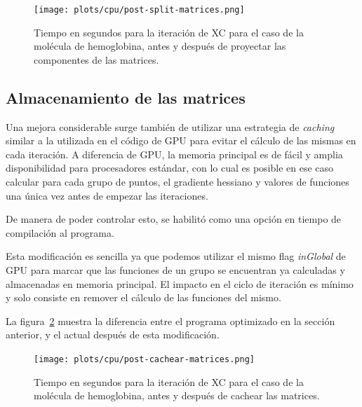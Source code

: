 \begin{figure}[htbp]
   \centering
   \texttt{[image: plots/cpu/post-split-matrices.png]}
   \caption{Tiempo en segundos para la iteraci\'on de XC para el caso de la
   mol\'ecula de hemoglobina, antes y despu\'es de proyectar las componentes
   de las matrices.}
   \label{fig:lio-post-partir-mats}
\end{figure}

\subsection{Almacenamiento de las matrices}

Una mejora considerable surge tambi\'en de utilizar una estrategia de \textit{caching}
similar a la utilizada en el c\'odigo de GPU para evitar el c\'alculo de las mismas
en cada iteraci\'on. A diferencia de GPU, la memoria principal es de f\'acil y
amplia disponibilidad para procesadores est\'andar, con lo cual es posible en ese
caso calcular para cada grupo de puntos, el gradiente hessiano y valores de
funciones una \'unica vez antes de empezar las iteraciones.

De manera de poder controlar esto, se habilit\'o como una opci\'on en tiempo de
compilaci\'on al programa.

Esta modificaci\'on es sencilla ya que podemos utilizar el mismo flag
\textit{inGlobal} de GPU para marcar que las funciones de un grupo se encuentran
ya calculadas y almacenadas en memoria principal. El impacto en el ciclo de
iteraci\'on es m\'inimo y solo consiste en remover el c\'alculo de las funciones
del mismo.

La figura~\ref{fig:lio-post-cachear} muestra la diferencia entre el programa
optimizado en la secci\'on anterior, y el actual despu\'es de esta modificaci\'on.

\begin{figure}[htbp]
   \centering
   \texttt{[image: plots/cpu/post-cachear-matrices.png]}
   \caption{Tiempo en segundos para la iteraci\'on de XC para el caso de la
   mol\'ecula de hemoglobina, antes y despu\'es de cachear las matrices.}
   \label{fig:lio-post-cachear}
\end{figure}



